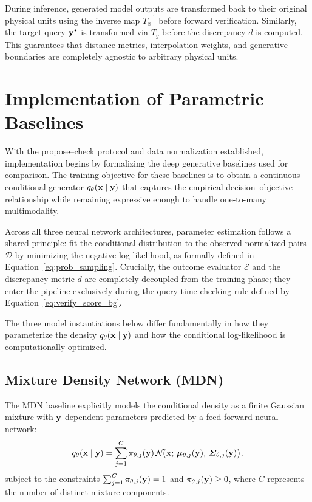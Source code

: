 During inference, generated model outputs are transformed back to their original physical units using the inverse map $T_x^{-1}$ before forward verification. Similarly, the target query $\mathbf{y}^\star$ is transformed via $T_y$ before the discrepancy $d$ is computed. This guarantees that distance metrics, interpolation weights, and generative boundaries are completely agnostic to arbitrary physical units.


\section{Implementation of Parametric Baselines}\label{sec:parametric_baselines}

With the propose--check protocol and data normalization established, implementation begins by formalizing the deep generative baselines used for comparison. The training objective for these baselines is to obtain a continuous conditional generator $q_{\theta}(\mathbf{x}\mid\mathbf{y})$ that captures the empirical decision--objective relationship while remaining expressive enough to handle one-to-many multimodality. 

Across all three neural network architectures, parameter estimation follows a shared principle: fit the conditional distribution to the observed normalized pairs $\mathcal{D}$ by minimizing the negative log-likelihood, as formally defined in Equation~\eqref{eq:prob_sampling}. Crucially, the outcome evaluator $\mathcal{E}$ and the discrepancy metric $d$ are completely decoupled from the training phase; they enter the pipeline exclusively during the query-time checking rule defined by Equation~\eqref{eq:verify_score_bg}.

The three model instantiations below differ fundamentally in how they parameterize the density $q_{\theta}(\mathbf{x}\mid\mathbf{y})$ and how the conditional log-likelihood is computationally optimized.

\subsection{Mixture Density Network (MDN)}\label{subsec:mdn_training}

The MDN baseline explicitly models the conditional density as a finite Gaussian mixture with $\mathbf{y}$-dependent parameters predicted by a feed-forward neural network:
\begin{equation}
  q_{\theta}(\mathbf{x}\mid\mathbf{y}) =
  \sum_{j=1}^{C}\pi_{\theta,j}(\mathbf{y})\,
  \mathcal{N}\!\big(\mathbf{x};\,\boldsymbol{\mu}_{\theta,j}(\mathbf{y}),\,\boldsymbol{\Sigma}_{\theta,j}(\mathbf{y})\big),
  \label{eq:mdn_density_methodology}
\end{equation}
subject to the constraints $\sum_{j=1}^{C}\pi_{\theta,j}(\mathbf{y})=1$ and $\pi_{\theta,j}(\mathbf{y})\ge 0$, where $C$ represents the number of distinct mixture components. 

